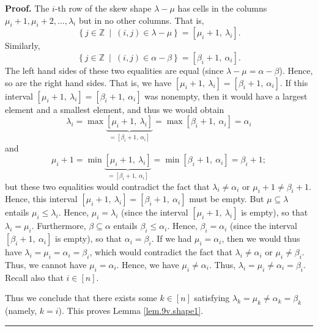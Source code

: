 \documentclass[numbers=enddot,12pt,final,onecolumn,notitlepage]{scrartcl}%
\theoremstyle{definition}
\newenvironment{proof}[1][Proof]{\noindent\textbf{#1.} }{\ \rule{0.5em}{0.5em}}
\begin{document}
\begin{enumerate}
\begin{proof}
The $i$-th row of the skew shape $\lambda-\mu$ has cells in the columns
$\mu_{i}+1,\mu_{i}+2,\ldots,\lambda_{i}$ but in no other columns. That is,%
\[
\left\{  j\in\mathbb{Z}\ \mid\ \left(  i,j\right)  \in\lambda-\mu\right\}
=\left[  \mu_{i}+1,\ \lambda_{i}\right]  .
\]
Similarly,%
\[
\left\{  j\in\mathbb{Z}\ \mid\ \left(  i,j\right)  \in\alpha-\beta\right\}
=\left[  \beta_{i}+1,\ \alpha_{i}\right]  .
\]
The left hand sides of these two equalities are equal (since $\lambda
-\mu=\alpha-\beta$). Hence, so are the right hand sides. That is, we have
$\left[  \mu_{i}+1,\ \lambda_{i}\right]  =\left[  \beta_{i}+1,\ \alpha
_{i}\right]  $. If this interval $\left[  \mu_{i}+1,\ \lambda_{i}\right]
=\left[  \beta_{i}+1,\ \alpha_{i}\right]  $ was nonempty, then it would have a
largest element and a smallest element, and thus we would obtain%
\[
\lambda_{i}=\max\underbrace{\left[  \mu_{i}+1,\ \lambda_{i}\right]
}_{=\left[  \beta_{i}+1,\ \alpha_{i}\right]  }=\max\left[  \beta
_{i}+1,\ \alpha_{i}\right]  =\alpha_{i}%
\]
and%
\[
\mu_{i}+1=\min\underbrace{\left[  \mu_{i}+1,\ \lambda_{i}\right]  }_{=\left[
\beta_{i}+1,\ \alpha_{i}\right]  }=\min\left[  \beta_{i}+1,\ \alpha
_{i}\right]  =\beta_{i}+1;
\]
but these two equalities would contradict the fact that $\lambda_{i}\neq
\alpha_{i}$ or $\mu_{i}+1\neq\beta_{i}+1$. Hence, this interval $\left[
\mu_{i}+1,\ \lambda_{i}\right]  =\left[  \beta_{i}+1,\ \alpha_{i}\right]  $
must be empty. But $\mu\subseteq\lambda$ entails $\mu_{i}\leq\lambda_{i}$.
Hence, $\mu_{i}=\lambda_{i}$ (since the interval $\left[  \mu_{i}%
+1,\ \lambda_{i}\right]  $ is empty), so that $\lambda_{i}=\mu_{i}$.
Furthermore, $\beta\subseteq\alpha$ entails $\beta_{i}\leq\alpha_{i}$. Hence,
$\beta_{i}=\alpha_{i}$ (since the interval $\left[  \beta_{i}+1,\ \alpha
_{i}\right]  $ is empty), so that $\alpha_{i}=\beta_{i}$. If we had $\mu
_{i}=\alpha_{i}$, then we would thus have $\lambda_{i}=\mu_{i}=\alpha
_{i}=\beta_{i}$, which would contradict the fact that $\lambda_{i}\neq
\alpha_{i}$ or $\mu_{i}\neq\beta_{i}$. Thus, we cannot have $\mu_{i}%
=\alpha_{i}$. Hence, we have $\mu_{i}\neq\alpha_{i}$. Thus, $\lambda_{i}%
=\mu_{i}\neq\alpha_{i}=\beta_{i}$. Recall also that $i\in\left[  n\right]  $.

Thus we conclude that there exists some $k\in\left[  n\right]  $ satisfying
$\lambda_{k}=\mu_{k}\neq\alpha_{k}=\beta_{k}$ (namely, $k=i$). This proves
Lemma \ref{lem.9v.shape1}.
\end{proof}


\end{enumerate}
\end{document}

